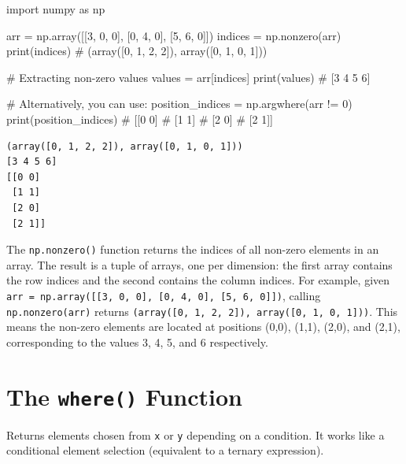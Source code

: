\documentclass[
  english,
  letterpaper,
  DIV=11,
  numbers=noendperiod]{scrreprt}
\newenvironment{Shaded}{\begin{snugshade}}{\end{snugshade}}
\newcommand{\BuiltInTok}[1]{\textcolor[rgb]{0.00,0.23,0.31}{#1}}
\newcommand{\CommentTok}[1]{\textcolor[rgb]{0.37,0.37,0.37}{#1}}
\newcommand{\DecValTok}[1]{\textcolor[rgb]{0.68,0.00,0.00}{#1}}
\newcommand{\ImportTok}[1]{\textcolor[rgb]{0.00,0.46,0.62}{#1}}
\newcommand{\NormalTok}[1]{\textcolor[rgb]{0.00,0.23,0.31}{#1}}
\newcommand{\OperatorTok}[1]{\textcolor[rgb]{0.37,0.37,0.37}{#1}}
\begin{document}
\begin{Shaded}
\begin{Highlighting}[]
\ImportTok{import}\NormalTok{ numpy }\ImportTok{as}\NormalTok{ np}

\NormalTok{arr }\OperatorTok{=}\NormalTok{ np.array([[}\DecValTok{3}\NormalTok{, }\DecValTok{0}\NormalTok{, }\DecValTok{0}\NormalTok{], [}\DecValTok{0}\NormalTok{, }\DecValTok{4}\NormalTok{, }\DecValTok{0}\NormalTok{], [}\DecValTok{5}\NormalTok{, }\DecValTok{6}\NormalTok{, }\DecValTok{0}\NormalTok{]])}
\NormalTok{indices }\OperatorTok{=}\NormalTok{ np.nonzero(arr)}
\BuiltInTok{print}\NormalTok{(indices)  }\CommentTok{\# (array([0, 1, 2, 2]), array([0, 1, 0, 1]))}

\CommentTok{\# Extracting non{-}zero values}
\NormalTok{values }\OperatorTok{=}\NormalTok{ arr[indices]}
\BuiltInTok{print}\NormalTok{(values)  }\CommentTok{\# [3 4 5 6]}

\CommentTok{\# Alternatively, you can use:}
\NormalTok{position\_indices }\OperatorTok{=}\NormalTok{ np.argwhere(arr }\OperatorTok{!=} \DecValTok{0}\NormalTok{)}
\BuiltInTok{print}\NormalTok{(position\_indices)}
\CommentTok{\# [[0 0]}
\CommentTok{\#  [1 1]}
\CommentTok{\#  [2 0]}
\CommentTok{\#  [2 1]]}
\end{Highlighting}
\end{Shaded}

\begin{verbatim}
(array([0, 1, 2, 2]), array([0, 1, 0, 1]))
[3 4 5 6]
[[0 0]
 [1 1]
 [2 0]
 [2 1]]
\end{verbatim}

The \texttt{np.nonzero()} function returns the indices of all non-zero
elements in an array. The result is a tuple of arrays, one per
dimension: the first array contains the row indices and the second
contains the column indices. For example, given
\texttt{arr\ =\ np.array({[}{[}3,\ 0,\ 0{]},\ {[}0,\ 4,\ 0{]},\ {[}5,\ 6,\ 0{]}{]})},
calling \texttt{np.nonzero(arr)} returns
\texttt{(array({[}0,\ 1,\ 2,\ 2{]}),\ array({[}0,\ 1,\ 0,\ 1{]}))}. This
means the non-zero elements are located at positions (0,0), (1,1),
(2,0), and (2,1), corresponding to the values 3, 4, 5, and 6
respectively.

\section{\texorpdfstring{The \texttt{where()}
Function}{The where() Function}}\label{the-where-function}

Returns elements chosen from \texttt{x} or \texttt{y} depending on a
condition. It works like a conditional element selection (equivalent to
a ternary expression).
\end{document}
